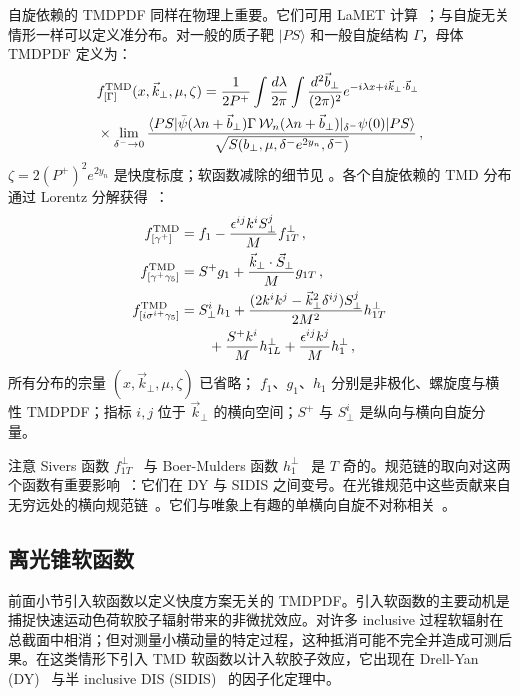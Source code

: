 自旋依赖的 TMDPDF 同样在物理上重要。它们可用 LaMET 计算~\cite{Ebert:2020gxr}；与自旋无关情形一样可以定义准分布。对一般的质子靶 $|PS\rangle$ 和一般自旋结构 $\Gamma$，母体 TMDPDF 定义为：
\begin{align}\label{eq:parent_TMD}
	&f_{[\Gamma]}^{\rm TMD}(x,\vec{k}_\perp,\mu,\zeta)=\frac{1}{2P^+}\int\frac{d\lambda}{2\pi}\int\frac{d^2 \vec{b}_\perp}{(2\pi)^2}e^{-i\lambda x + i\vec{k}_\perp\cdot \vec{b}_\perp}\nonumber\\
	&\times \lim_{\delta^- \rightarrow 0}\frac{\langle PS|\bar\psi(\lambda n+\vec{b}_\perp)\Gamma\, {\cal W}_n(\lambda n +\vec{b}_\perp)|_{\delta^-}\psi(0)|PS\rangle}{\sqrt{S(b_\perp,\mu,\delta^-e^{2y_n},\delta^-)}} \,,
\end{align}
$\zeta=2(P^+)^2e^{2y_n}$ 是快度标度；软函数减除的细节见 。各个自旋依赖的 TMD 分布通过 Lorentz 分解获得~\cite{Tangerman:1994eh,Ralston:1979ys,Mulders:1995dh}：
\begin{align}\label{eq:TMDPDF}
	f_{[\gamma^+]}^{\rm TMD}&=f_1-\frac{\epsilon^{ij}k^i S^j_\perp}{M}f_{1T}^\perp   \,,\\
	f_{[\gamma^+\gamma_5]}^{\rm TMD}&=S^+ g_1+\frac{\vec{k}_\perp\cdot \vec{S}_\perp}{M}g_{1T} \,, \\
	f_{[i\sigma^{i+}\gamma_5]}^{\rm TMD}&=S_\perp^i h_1+\frac{(2k^i k^j-\vec{k}_\perp^2\delta^{ij})S^j_\perp}{2M^2}h_{1T}^\perp\nonumber\\
	&\qquad+\frac{S^+ k^i}{M}h_{1L}^\perp+\frac{\epsilon^{ij} k^j}{M}h_1^\perp \,,
\end{align}
所有分布的宗量 $(x,\vec{k}_\perp,\mu,\zeta)$ 已省略；
$f_1$、$g_1$、$h_1$ 分别是非极化、螺旋度与横性 TMDPDF；指标 $i,j$ 位于 $\vec{k}_\perp$ 的横向空间；$S^+$ 与 $S^i_\perp$ 是纵向与横向自旋分量。

注意 Sivers 函数 $f^\perp_{1T}$~\cite{Sivers:1989cc} 与 Boer-Mulders 函数 $h^\perp_1$~\cite{Boer:1997nt} 是 $T$ 奇的。规范链的取向对这两个函数有重要影响~\cite{Collins:2002kn,Collins:2011zzd}：它们在 DY 与 SIDIS 之间变号。在光锥规范中这些贡献来自无穷远处的横向规范链~\cite{Belitsky:2002sm}。它们与唯象上有趣的单横向自旋不对称相关~\cite{Boer:1997nt,Efremov:2004tp,Collins:2005ie,Collins:2005wb}。

\subsection{离光锥软函数}
\label{sec:offlight}
前面小节引入软函数以定义快度方案无关的 TMDPDF。引入软函数的主要动机是捕捉快速运动色荷软胶子辐射带来的非微扰效应。对许多 inclusive 过程软辐射在总截面中相消；但对测量小横动量的特定过程，这种抵消可能不完全并造成可测后果。在这类情形下引入 TMD 软函数以计入软胶子效应，它出现在 Drell-Yan (DY)~\cite{Collins:1984kg,Collins:1988ig} 与半 inclusive DIS (SIDIS)~\cite{Ji:2004wu,Ji:2004xq} 的因子化定理中。

